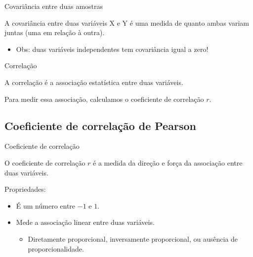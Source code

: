 \documentclass{beamer}
\begin{document}
\begin{frame}{Covariância entre duas amostras}
  \begin{definition}
    A covariância entre duas variáveis X e Y é uma medida de quanto
    ambas variam juntas (uma em relação à outra).
  \end{definition}
  \begin{itemize}
  \item Obs: duas variáveis independentes tem covariância igual a zero!
  \end{itemize}
\end{frame}

\begin{frame}{Correlação}
  \begin{definition}
    A correlação é a associação estatística entre duas variáveis.
  \end{definition}
  
  Para medir essa associação, calculamos o \alert{coeficiente de
    correlação} $r$.
  
\end{frame}



\subsection[Pearson]{Coeficiente de correlação de Pearson}

\begin{frame}{Coeficiente de correlação}
  \begin{definition}
    O coeficiente de correlação $r$ é a medida da direção e força da
    associação entre duas variáveis.
  \end{definition}
  Propriedades:
  \begin{itemize}
  \item É um número entre $-1$ e $1$.
  \item Mede a associação \alert{linear} entre duas variáveis.
    \begin{itemize}
    \item Diretamente proporcional, inversamente proporcional, ou
      ausência de proporcionalidade.
    \end{itemize}
  \end{itemize}
\end{frame}
\end{document}
